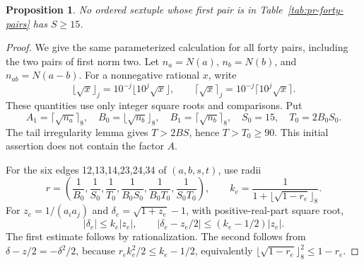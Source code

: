 \documentclass[12pt]{article}
\newtheorem{proposition}[theorem]{Proposition}
\numberwithin{equation}{section}
\begin{document}
\begin{proposition}\label{prop:pr-S15}
No ordered sextuple whose first pair is in
Table~\ref{tab:pr-forty-pairs} has \(S\ge15\).
\end{proposition}
\begin{proof}
We give the same parameterized calculation for all forty pairs,
including the two pairs of first norm two. Let
\(n_a=N(a)\), \(n_b=N(b)\), and \(n_{ab}=N(a-b)\).
For a nonnegative rational \(x\), write
\[
 \lfloor\sqrt{x}\rfloor_j=10^{-j}\lfloor10^j\sqrt{x}\rfloor,
 \qquad
 \lceil\sqrt{x}\rceil_j=10^{-j}\lceil10^j\sqrt{x}\rceil.
\]
These quantities use only integer square roots and comparisons.
Put
\[
 A_1=\lceil\sqrt{n_a}\rceil_8,\quad
 B_0=\lfloor\sqrt{n_b}\rfloor_8,\quad
 B_1=\lceil\sqrt{n_b}\rceil_8,\quad S_0=15,\quad T_0=2B_0S_0.
\]
The tail irregularity lemma gives \(T>2BS\), hence \(T>T_0\ge90\).
This initial assertion does not contain the factor \(A\).

For the six edges 12,13,14,23,24,34 of \((a,b,s,t)\), use radii
\[
 r=\left(\frac1{B_0},\frac1{S_0},\frac1{T_0},
       \frac1{B_0S_0},\frac1{B_0T_0},\frac1{S_0T_0}\right),
 \qquad k_e=\frac1{1+\lfloor\sqrt{1-r_e}\rfloor_8}.
\]
For \(z_e=1/(a_i a_j)\) and
\(\delta_e=\sqrt{1+z_e}-1\), with positive-real-part square root,
\[
 |\delta_e|\le k_e|z_e|,\qquad
 |\delta_e-z_e/2|\le(k_e-1/2)|z_e|.
\]
The first estimate follows by rationalization. The second follows
from \(\delta-z/2=-\delta^2/2\), because
\(r_ek_e^2/2\le k_e-1/2\), equivalently
\(\lfloor\sqrt{1-r_e}\rfloor_8^2\le1-r_e\).


\end{proof}
\end{document}
